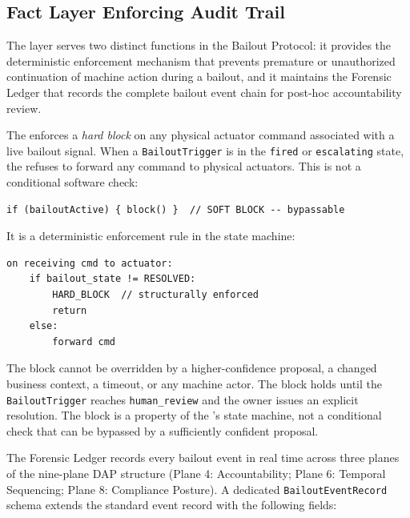 \subsection{Fact Layer Enforcing Audit Trail}
\label{sec:fact-enforcement}

The \fact{} layer serves two distinct functions in the Bailout Protocol: it provides the deterministic enforcement mechanism that prevents premature or unauthorized continuation of machine action during a bailout, and it maintains the Forensic Ledger that records the complete bailout event chain for post-hoc accountability review.

The \fact{} enforces a \textit{hard block} on any physical actuator command associated with a live bailout signal. When a \texttt{BailoutTrigger} is in the \texttt{fired} or \texttt{escalating} state, the \fact{} refuses to forward any \bounds{} command to physical actuators. This is not a conditional software check:

\begin{verbatim}
if (bailoutActive) { block() }  // SOFT BLOCK -- bypassable
\end{verbatim}

It is a deterministic enforcement rule in the \fact{} state machine:

\begin{verbatim}
on receiving cmd to actuator:
    if bailout_state != RESOLVED:
        HARD_BLOCK  // structurally enforced
        return
    else:
        forward cmd
\end{verbatim}

The block cannot be overridden by a higher-confidence \bounds{} proposal, a changed business context, a timeout, or any machine actor. The block holds until the \texttt{BailoutTrigger} reaches \texttt{human\_review} and the \purpose{} owner issues an explicit resolution. The block is a property of the \fact{}'s state machine, not a conditional check that can be bypassed by a sufficiently confident proposal.

The Forensic Ledger records every bailout event in real time across three planes of the nine-plane DAP structure (Plane 4: Accountability; Plane 6: Temporal Sequencing; Plane 8: Compliance Posture). A dedicated \texttt{BailoutEventRecord} schema extends the standard event record with the following fields:

